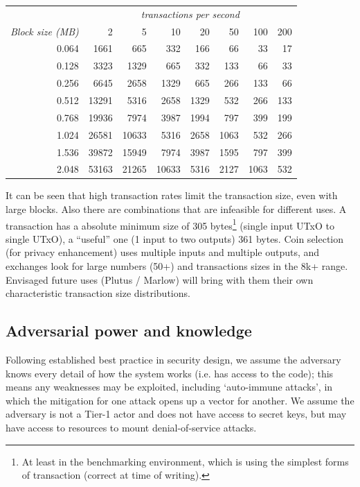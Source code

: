 \documentclass[11pt,a4paper]{article}
\begin{document}
\begin{table}
  \caption{Transaction size as a function of block size and transactions per
  second}
  \label{table:transaction-size}
\begin{longtable}[]{r|rrrrrrr}
\toprule
  & \multicolumn{7}{c}{\textit{transactions per second}}\tabularnewline
\textit{Block size (MB)} & 2 & 5 & 10 & 20 & 50 & 100 & 200\tabularnewline
\midrule
\endhead
0.064 & 1661 & 665 & 332 & 166 & 66 & 33 & 17\tabularnewline
0.128 & 3323 & 1329 & 665 & 332 & 133 & 66 & 33\tabularnewline
0.256 & 6645 & 2658 & 1329 & 665 & 266 & 133 & 66\tabularnewline
0.512 & 13291 & 5316 & 2658 & 1329 & 532 & 266 & 133\tabularnewline
0.768 & 19936 & 7974 & 3987 & 1994 & 797 & 399 & 199\tabularnewline
1.024 & 26581 & 10633 & 5316 & 2658 & 1063 & 532 & 266\tabularnewline
1.536 & 39872 & 15949 & 7974 & 3987 & 1595 & 797 & 399\tabularnewline
2.048 & 53163 & 21265 & 10633 & 5316 & 2127 & 1063 & 532\tabularnewline
\bottomrule
\end{longtable}
\end{table}

It can be seen that high transaction rates limit the transaction size,
even with large blocks. Also there are combinations that are infeasible
for different uses. A transaction has a absolute minimum size of 305 
bytes\footnote{At least in the benchmarking
environment, which is using the simplest forms of transaction 
(correct at time of writing).} (single
input UTxO to single UTxO), a ``useful'' one (1 input to two outputs) 361
bytes. Coin selection (for privacy enhancement) uses multiple inputs and
multiple outputs, and exchanges look for large numbers (50+) and
transactions sizes in the 8k+ range. Envisaged future uses (Plutus /
Marlow) will bring with them their own characteristic transaction size
distributions.

\subsection{Adversarial power and knowledge}
\label{adversarial-power-and-knowledge}

Following established best practice in security design, we assume the
adversary knows every detail of how the system works (i.e. has access to
the code); this means any weaknesses may be exploited, including
`auto-immune attacks', in which the mitigation for one attack opens up a
vector for another. We assume the adversary is not a Tier-1 actor and
does not have access to secret keys, but may have access to resources to
mount denial-of-service attacks.
\end{document}
